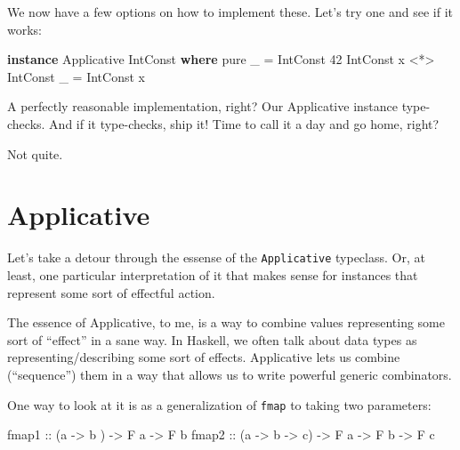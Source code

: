 \documentclass[]{article}
\newenvironment{Shaded}{}{}
\newcommand{\DataTypeTok}[1]{\textcolor[rgb]{0.56,0.13,0.00}{#1}}
\newcommand{\DecValTok}[1]{\textcolor[rgb]{0.25,0.63,0.44}{#1}}
\newcommand{\FunctionTok}[1]{\textcolor[rgb]{0.02,0.16,0.49}{#1}}
\newcommand{\KeywordTok}[1]{\textcolor[rgb]{0.00,0.44,0.13}{\textbf{#1}}}
\newcommand{\NormalTok}[1]{#1}
\newcommand{\OperatorTok}[1]{\textcolor[rgb]{0.40,0.40,0.40}{#1}}
\newcommand{\OtherTok}[1]{\textcolor[rgb]{0.00,0.44,0.13}{#1}}
\begin{document}
We now have a few options on how to implement these. Let's try one and see if it
works:

\begin{Shaded}
\begin{Highlighting}[]
\KeywordTok{instance} \DataTypeTok{Applicative} \DataTypeTok{IntConst} \KeywordTok{where}
    \FunctionTok{pure}\NormalTok{ \_                    }\OtherTok{=} \DataTypeTok{IntConst} \DecValTok{42}
    \DataTypeTok{IntConst}\NormalTok{ x }\OperatorTok{\textless{}*\textgreater{}} \DataTypeTok{IntConst}\NormalTok{ \_ }\OtherTok{=} \DataTypeTok{IntConst}\NormalTok{ x}
\end{Highlighting}
\end{Shaded}

A perfectly reasonable implementation, right? Our Applicative instance
type-checks. And if it type-checks, ship it! Time to call it a day and go home,
right?

Not quite.

\section{Applicative}\label{applicative}

Let's take a detour through the essense of the \texttt{Applicative} typeclass.
Or, at least, one particular interpretation of it that makes sense for instances
that represent some sort of effectful action.

The essence of Applicative, to me, is a way to combine values representing some
sort of ``effect'' in a sane way. In Haskell, we often talk about data types as
representing/describing some sort of effects. Applicative lets us combine
(``sequence'') them in a way that allows us to write powerful generic
combinators.

One way to look at it is as a generalization of \texttt{fmap} to taking two
parameters:

\begin{Shaded}
\begin{Highlighting}[]
\OtherTok{fmap1 ::}\NormalTok{ (a }\OtherTok{{-}\textgreater{}}\NormalTok{ b     ) }\OtherTok{{-}\textgreater{}} \DataTypeTok{F}\NormalTok{ a }\OtherTok{{-}\textgreater{}} \DataTypeTok{F}\NormalTok{ b}
\OtherTok{fmap2 ::}\NormalTok{ (a }\OtherTok{{-}\textgreater{}}\NormalTok{ b }\OtherTok{{-}\textgreater{}}\NormalTok{ c) }\OtherTok{{-}\textgreater{}} \DataTypeTok{F}\NormalTok{ a }\OtherTok{{-}\textgreater{}} \DataTypeTok{F}\NormalTok{ b }\OtherTok{{-}\textgreater{}} \DataTypeTok{F}\NormalTok{ c}
\end{Highlighting}
\end{Shaded}
\end{document}

